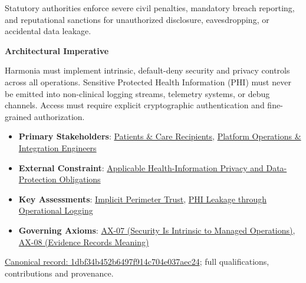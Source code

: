Statutory authorities enforce severe civil penalties, mandatory breach reporting, and reputational sanctions for unauthorized disclosure, eavesdropping, or accidental data leakage.



\par\medskip\textbf{Architectural Imperative}\par


Harmonia must implement intrinsic, default-deny security and privacy controls across all operations. Sensitive Protected Health Information (PHI) must never be emitted into non-clinical logging streams, telemetry systems, or debug channels. Access must require explicit cryptographic authentication and fine-grained authorization.



\begin{itemize}


\item \textbf{Primary Stakeholders}: \href{\detokenize{../../../../../docs/markdown/01-motivation/stakeholders/enterprise-stakeholders.md}}{Patients \& Care Recipients}, \href{\detokenize{../../../../../docs/markdown/01-motivation/stakeholders/enterprise-stakeholders.md}}{Platform Operations \& Integration Engineers}

\item \textbf{External Constraint}: \href{\detokenize{../../../../../docs/markdown/01-motivation/requirements-constraints/external-constraints.md}}{Applicable Health-Information Privacy and Data-Protection Obligations}

\item \textbf{Key Assessments}: \href{\detokenize{../../../../../docs/markdown/01-motivation/drivers-assessments/assessments.md}}{Implicit Perimeter Trust}, \href{\detokenize{../../../../../docs/markdown/01-motivation/drivers-assessments/assessments.md}}{PHI Leakage through Operational Logging}

\item \textbf{Governing Axioms}: \hyperref[element:5de2ae2c3b794c2d9f3a14efd51d564f]{AX-07 (Security Is Intrinsic to Managed Operations)}, \hyperref[element:21d6864657964ba5b03e3f6b5eb29cd5]{AX-08 (Evidence Records Meaning)}

\end{itemize}

{\footnotesize \href{../../../../continuum/motivation/driver/1dbf34b452b6497f914c704e037aec24.md}{Canonical record: 1dbf34b452b6497f914c704e037aec24}; full qualifications, contributions and provenance.}\par

